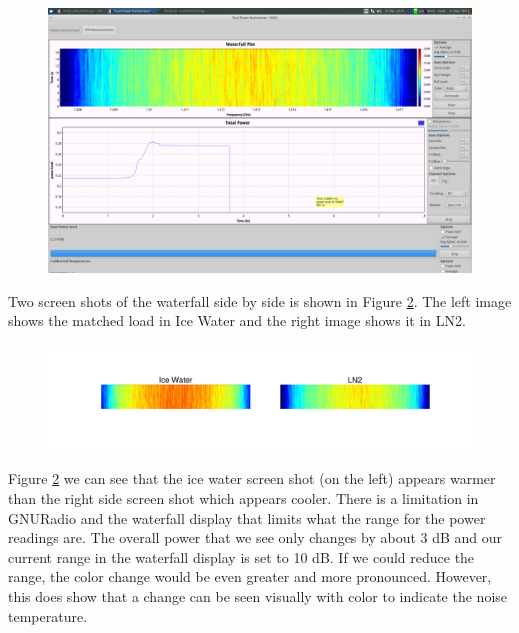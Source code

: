 {\begin{figure}[h!tb] \centering

\includegraphics[width=\textwidth]{Experiments/Exp1/LN2_waterfall.png}

\label{LN2_waterfall}
\end{figure}

Two screen shots of the waterfall side by side is shown in Figure \ref{side_waterfall}.  The left image shows the matched load in Ice Water and the right image shows it in LN2.

\begin{figure}[h!tb] \centering

\includegraphics[width=\textwidth]{Experiments/Exp1/waterfall_side.pdf}

\label{side_waterfall}
\end{figure}

Figure \ref{side_waterfall} we can see that the ice water screen shot (on the left) appears warmer than the right side screen shot which appears cooler.  There is a limitation in GNURadio and the waterfall display that limits what the range for the power readings are.  The overall power that we see only changes by about 3 dB and our current range in the waterfall display is set to 10 dB.  If we could reduce the range, the color change would be even greater and more pronounced.  However, this does show that a change can be seen visually with color to indicate the noise temperature.  

}

